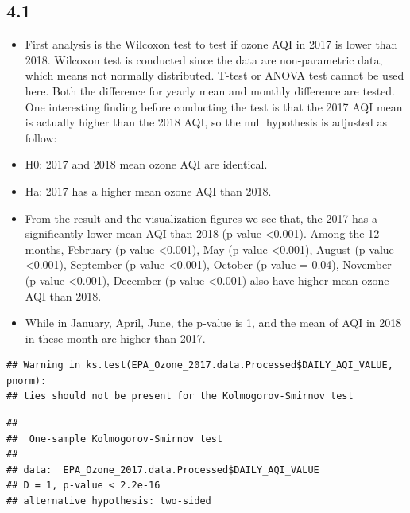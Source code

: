 \documentclass[12pt,]{article}
\newenvironment{Shaded}{\begin{snugshade}}{\end{snugshade}}
\newcommand{\KeywordTok}[1]{\textcolor[rgb]{0.13,0.29,0.53}{\textbf{#1}}}
\newcommand{\FloatTok}[1]{\textcolor[rgb]{0.00,0.00,0.81}{#1}}
\newcommand{\CommentTok}[1]{\textcolor[rgb]{0.56,0.35,0.01}{\textit{#1}}}
\newcommand{\OperatorTok}[1]{\textcolor[rgb]{0.81,0.36,0.00}{\textbf{#1}}}
\newcommand{\NormalTok}[1]{#1}
\begin{document}
\subsection{4.1}\label{section}

\begin{itemize}
\item[] First analysis is the Wilcoxon test to test if ozone AQI in 2017 is lower than 2018. Wilcoxon test is conducted since the data are non-parametric data, which means not normally distributed. T-test or ANOVA test cannot be used here. Both the difference for yearly mean and monthly difference are tested. One interesting finding before conducting the test is that the 2017 AQI mean is actually higher than the 2018 AQI, so the null hypothesis is adjusted as follow:  
\item[]H0: 2017 and 2018 mean ozone AQI are identical.  \
\item[]Ha: 2017 has a higher mean ozone AQI than 2018.  \
\item[]From the result and the visualization figures we see that, the 2017 has a significantly lower mean AQI than 2018 (p-value <0.001). Among the 12 months, February (p-value <0.001), May (p-value <0.001), August (p-value <0.001), September (p-value <0.001), October (p-value = 0.04), November (p-value <0.001), December (p-value <0.001) also have higher mean ozone AQI than 2018.
\item[]While in January, April, June, the p-value is 1, and the mean of AQI in 2018 in these month are higher than 2017.
\end{itemize}

\begin{Shaded}
\end{Shaded}

\begin{verbatim}
## Warning in ks.test(EPA_Ozone_2017.data.Processed$DAILY_AQI_VALUE, pnorm):
## ties should not be present for the Kolmogorov-Smirnov test
\end{verbatim}

\begin{verbatim}
## 
##  One-sample Kolmogorov-Smirnov test
## 
## data:  EPA_Ozone_2017.data.Processed$DAILY_AQI_VALUE
## D = 1, p-value < 2.2e-16
## alternative hypothesis: two-sided
\end{verbatim}
\end{document}
